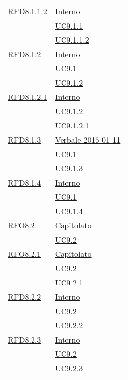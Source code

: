 \begin{longtable}{|>{\centering}m{5cm}|m{5cm}<{\centering}|}
\hyperlink{RFD8.1.1.2}{RFD8.1.1.2} & \hyperlink{Interno}{Interno}\\
& \hyperref[UC9.1.1]{UC9.1.1}\\
& \hyperref[UC9.1.1.2]{UC9.1.1.2}\\ \hline

\hyperlink{RFD8.1.2}{RFD8.1.2} & \hyperlink{Interno}{Interno}\\
& \hyperref[UC9.1]{UC9.1}\\
& \hyperref[UC9.1.2]{UC9.1.2}\\ \hline

\hyperlink{RFD8.1.2.1}{RFD8.1.2.1} & \hyperlink{Interno}{Interno}\\
& \hyperref[UC9.1.2]{UC9.1.2}\\
& \hyperref[UC9.1.2.1]{UC9.1.2.1}\\ \hline

\hyperlink{RFD8.1.3}{RFD8.1.3} & \hyperlink{Verbale 2016-01-11}{Verbale 2016-01-11}\\
& \hyperref[UC9.1]{UC9.1}\\
& \hyperref[UC9.1.3]{UC9.1.3}\\ \hline

\hyperlink{RFD8.1.4}{RFD8.1.4} & \hyperlink{Interno}{Interno}\\
& \hyperref[UC9.1]{UC9.1}\\
& \hyperref[UC9.1.4]{UC9.1.4}\\ \hline

\hyperlink{RFO8.2}{RFO8.2} & \hyperlink{Capitolato}{Capitolato}\\
& \hyperref[UC9.2]{UC9.2}\\ \hline

\hyperlink{RFO8.2.1}{RFO8.2.1} & \hyperlink{Capitolato}{Capitolato}\\
& \hyperref[UC9.2]{UC9.2}\\
& \hyperref[UC9.2.1]{UC9.2.1}\\ \hline

\hyperlink{RFD8.2.2}{RFD8.2.2} & \hyperlink{Interno}{Interno}\\
& \hyperref[UC9.2]{UC9.2}\\
& \hyperref[UC9.2.2]{UC9.2.2}\\ \hline

\hyperlink{RFD8.2.3}{RFD8.2.3} & \hyperlink{Interno}{Interno}\\
& \hyperref[UC9.2]{UC9.2}\\
& \hyperref[UC9.2.3]{UC9.2.3}\\ \hline


\end{longtable}
